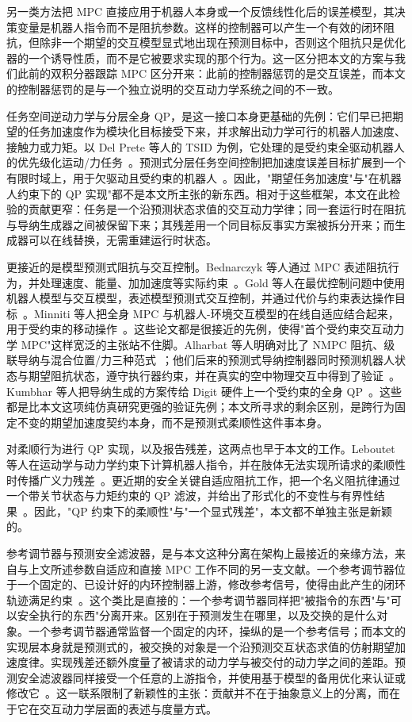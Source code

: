 \documentclass[journal]{IEEEtran}
\begin{document}
另一类方法把 MPC 直接应用于机器人本身或一个反馈线性化后的误差模型，其决策变量是机器人指令而不是阻抗参数。这样的控制器可以产生一个有效的闭环阻抗，但除非一个期望的交互模型显式地出现在预测目标中，否则这个阻抗只是优化器的一个诱导性质，而不是它被要求实现的那个行为。这一区分把本文的方案与我们此前的双积分器跟踪 MPC 区分开来：此前的控制器惩罚的是交互误差，而本文的控制器惩罚的是与一个独立说明的交互动力学系统之间的不一致。

任务空间逆动力学与分层全身 QP，是这一接口本身更基础的先例：它们早已把期望的任务加速度作为模块化目标接受下来，并求解出动力学可行的机器人加速度、接触力或力矩。以 Del Prete 等人的 TSID 为例，它处理的是受约束全驱动机器人的优先级化运动/力任务~\cite{ref19}。预测式分层任务空间控制把加速度误差目标扩展到一个有限时域上，用于欠驱动且受约束的机器人~\cite{ref20}。因此，"期望任务加速度"与"在机器人约束下的 QP 实现"都不是本文所主张的新东西。相对于这些框架，本文在此检验的贡献更窄：任务是一个沿预测状态求值的交互动力学律；同一套运行时在阻抗与导纳生成器之间被保留下来；其残差用一个同目标反事实方案被拆分开来；而生成器可以在线替换，无需重建运行时状态。

更接近的是模型预测式阻抗与交互控制。Bednarczyk 等人通过 MPC 表述阻抗行为，并处理速度、能量、加加速度等实际约束~\cite{ref5}。Gold 等人在最优控制问题中使用机器人模型与交互模型，表述模型预测式交互控制，并通过代价与约束表达操作目标~\cite{ref6}。Minniti 等人把全身 MPC 与机器人-环境交互模型的在线自适应结合起来，用于受约束的移动操作~\cite{ref7}。这些论文都是很接近的先例，使得"首个受约束交互动力学 MPC"这样宽泛的主张站不住脚。Alharbat 等人明确对比了 NMPC 阻抗、级联导纳与混合位置/力三种范式~\cite{ref14}；他们后来的预测式导纳控制器同时预测机器人状态与期望阻抗状态，遵守执行器约束，并在真实的空中物理交互中得到了验证~\cite{ref15}。Kumbhar 等人把导纳生成的方案传给 Digit 硬件上一个受约束的全身 QP~\cite{ref17}。这些都是比本文这项纯仿真研究更强的验证先例；本文所寻求的剩余区别，是跨行为固定不变的期望加速度契约本身，而不是预测式柔顺性这件事本身。

对柔顺行为进行 QP 实现，以及报告残差，这两点也早于本文的工作。Leboutet 等人在运动学与动力学约束下计算机器人指令，并在肢体无法实现所请求的柔顺性时传播广义力残差~\cite{ref16}。更近期的安全关键自适应阻抗工作，把一个名义阻抗律通过一个带关节状态与力矩约束的 QP 滤波，并给出了形式化的不变性与有界性结果~\cite{ref18}。因此，"QP 约束下的柔顺性"与"一个显式残差"，本文都不单独主张是新颖的。

参考调节器与预测安全滤波器，是与本文这种分离在架构上最接近的亲缘方法，来自与上文所述参数自适应和直接 MPC 工作不同的另一支文献。一个参考调节器位于一个固定的、已设计好的内环控制器上游，修改参考信号，使得由此产生的闭环轨迹满足约束~\cite{ref8}。这个类比是直接的：一个参考调节器同样把"被指令的东西"与"可以安全执行的东西"分离开来。区别在于预测发生在哪里，以及交换的是什么对象。一个参考调节器通常监督一个固定的内环，操纵的是一个参考信号；而本文的实现层本身就是预测式的，被交换的对象是一个沿预测交互状态求值的仿射期望加速度律。实现残差还额外度量了被请求的动力学与被交付的动力学之间的差距。预测安全滤波器同样接受一个任意的上游指令，并使用基于模型的备用优化来认证或修改它~\cite{ref13}。这一联系限制了新颖性的主张：贡献并不在于抽象意义上的分离，而在于它在交互动力学层面的表述与度量方式。
\end{document}
